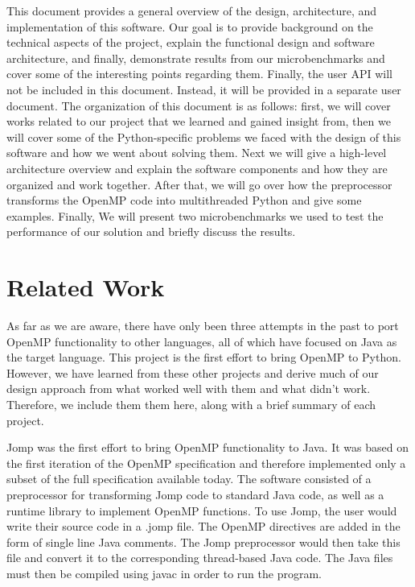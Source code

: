 \documentclass[letterpaper,12pt]{article} %
\begin{document}
This document provides a general overview of the design, architecture, and implementation of this software. Our goal is to provide background on the technical aspects of the project, explain the functional design and software architecture, and finally, demonstrate results from our microbenchmarks and cover some of the interesting points regarding them. Finally, the user API will not be included in this document. Instead, it will be provided in a separate user document. The organization of this document is as follows: first, we will cover works related to our project that we learned and gained insight from, then we will cover some of the Python-specific problems we faced with the design of this software and how we went about solving them. Next we will give a high-level architecture overview and explain the software components and how they are organized and work together. After that, we will go over how the preprocessor transforms the OpenMP code into multithreaded Python and give some examples. Finally, We will present two microbenchmarks we used to test the performance of our solution and briefly discuss the results.

\section{Related Work}

As far as we are aware, there have only been three attempts in the past to port OpenMP functionality to other languages, all of which have focused on Java as the target language. This project is the first effort to bring OpenMP to Python. However, we have learned from these other projects and derive much of our design approach from what worked well with them and what didn't work. Therefore, we include them them here, along with a brief summary of each project.

Jomp \cite{bull2000jomp} was the first effort to bring OpenMP functionality to Java. It was based on the first iteration of the OpenMP specification and therefore implemented only a subset of the full specification available today. The software consisted of a preprocessor for transforming Jomp code to standard Java code, as well as a runtime library to implement OpenMP functions. To use Jomp, the user would write their source code in a .jomp file. The OpenMP directives are added in the form of single line Java comments. The Jomp preprocessor would then take this file and convert it to the corresponding thread-based Java code. The Java files must then be compiled using javac in order to run the program. 
\end{document}
